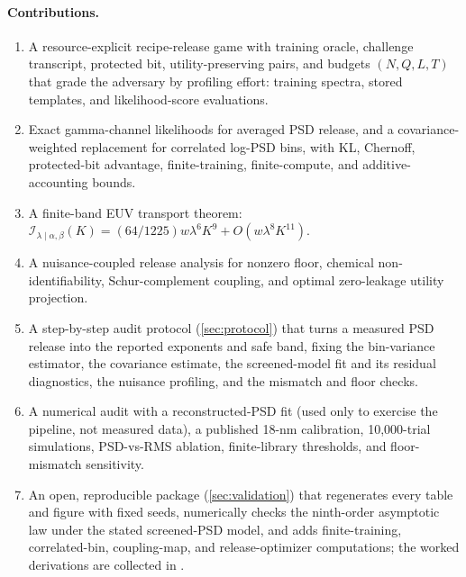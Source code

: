 \documentclass[11pt]{article}
\begin{document}
\paragraph{Contributions.}
\begin{enumerate}[label=(\arabic*)]
\item A resource-explicit recipe-release game with training oracle, challenge transcript, protected bit, utility-preserving pairs, and budgets \((N,Q,L,T)\) that grade the adversary by profiling effort: training spectra, stored templates, and likelihood-score evaluations.
\item Exact gamma-channel likelihoods for averaged PSD release, and a covariance-weighted replacement for correlated log-PSD bins, with KL, Chernoff, protected-bit advantage, finite-training, finite-compute, and additive-accounting bounds.
\item A finite-band EUV transport theorem: \(\mathcal I_{\lambda\mid\alpha,\beta}(K)=(64/1225)w\lambda^6K^9+O(w\lambda^8K^{11})\).
\item A nuisance-coupled release analysis for nonzero floor, chemical non-identifiability, Schur-complement coupling, and optimal zero-leakage utility projection.
\item A step-by-step audit protocol (\cref{sec:protocol}) that turns a measured PSD release into the reported exponents and safe band, fixing the bin-variance estimator, the covariance estimate, the screened-model fit and its residual diagnostics, the nuisance profiling, and the mismatch and floor checks.
\item A numerical audit with a reconstructed-PSD fit (used only to exercise the pipeline, not measured data), a published 18-nm calibration, 10{,}000-trial simulations, PSD-vs-RMS ablation, finite-library thresholds, and floor-mismatch sensitivity.
\item An open, reproducible package (\cref{sec:validation}) that regenerates every table and figure with fixed seeds, numerically checks the ninth-order asymptotic law under the stated screened-PSD model, and adds finite-training, correlated-bin, coupling-map, and release-optimizer computations; the worked derivations are collected in .
\end{enumerate}
\end{document}
